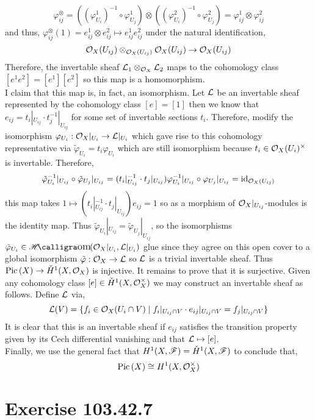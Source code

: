 \documentclass[12pt]{article}
\begin{document}
\[ \varphi_{ij}^\otimes = ((\varphi^1_{U_i})^{-1} \circ \varphi^1_{U_j}) \otimes ((\varphi^2_{U_i})^{-1} \circ \varphi^2_{U_j}) = \varphi_{ij}^1 \otimes \varphi_{ij}^2 \]
and thus, $\varphi_{ij}^\otimes(1) = e_{ij}^1 \otimes e^2_{ij} \mapsto e_{ij}^1 e_{ij}^2$ under the natural identification,
\[ \mathcal{O}_{X}(U_{ij}) \otimes_{\mathcal{O}_{X}(U_{ij})} \mathcal{O}_{X}(U_{ij}) \to \mathcal{O}_{X}(U_{ij}) \]
Therefore, the invertable sheaf $\mathcal{L}_1 \otimes_{\mathcal{O}_{X}} \mathcal{L}_2$ maps to the cohomology class $[e^1 e^2] = [e^1] [e^2]$ so this map is a homomorphism. 
\bigskip\\
I claim that this map is, in fact, an isomorphism. Let $\mathcal{L}$ be an invertable sheaf represented by the cohomology class $[e] = [1]$ then we know that $e_{ij} = t_i |_{U_{ij}} \cdot t_j^{-1} |_{U_{ij}}$ for some set of invertable sections $t_i$. Therefore, modify the isomorphism $\varphi_{U_i} : \mathcal{O}_{X}|_{U_i} \to \mathcal{L} |_{U_i}$ which gave rise to this cohomology representative via $\tilde{\varphi}_{U_i} = t_i \varphi_{U_i}$ which are still isomorphism because $t_i \in \mathcal{O}_{X}(U_i)^\times$ is invertable. Therefore, 
\[ \tilde{\varphi}_{U_i}^{-1}|_{U_{ij}} \circ \tilde{\varphi}_{U_j}|_{U_{ij}} = (t_i |_{U_{ij}}^{-1} \cdot t_j |_{U_{ij}}) \varphi_{U_i}^{-1}|_{U_{ij}} \circ \varphi_{U_j}|_{U_{ij}} = \mathrm{id}_{\mathcal{O}_{X}(U_{ij})} \]
this map takes $1 \mapsto (t_i |_{U_{ij}}^{-1} \cdot t_j |_{U_{ij}}) e_{ij} = 1$ so as a morphism of $\mathcal{O}_{X}|_{U_{ij}}$-modules is the identity map. Thus $\tilde{\varphi}_{U_i} |_{U_{ij}} = \tilde{\varphi}_{U_j} |_{U_{ij}}$, so the isomorphisms $\tilde{\varphi}_{U_i} \in \shHom{}{\struct{X}|_{U_i}}{\L|_{U_i}}$ glue since they agree on this open cover to a global isomorphism $\tilde{\varphi} : \mathcal{O}_{X} \to \mathcal{L}$ so $\mathcal{L}$ is a trivial invertable sheaf. Thus $\mathrm{Pic} \left( X \right) \to \check{H}^1(X, \mathcal{O}_{X})$ is injective. It remains to prove that it is surjective. Given any cohomology class $[e] \in \check{H}^1(X, \mathcal{O}_{X}^\times)$ we may construct an invertable sheaf as follows. Define $\mathcal{L}$ via,
\[ \mathcal{L}(V) = \{ f_i \in \mathcal{O}_{X}(U_i \cap V) \mid f_i |_{U_{ij} \cap V} \cdot e_{ij} |_{U_{ij} \cap V} = f_j |_{U_{ij} \cap V} \} \]
It is clear that this is an invertable sheaf if $e_{ij}$ satisfies the transition property given by its Cech differential vanishing and that $\mathcal{L} \mapsto [e]$. 
\bigskip\\
Finally, we use the general fact that $H^1(X, \mathscr{F}) = \check{H}^1(X, \mathscr{F})$ to conclude that,
\[ \mathrm{Pic} \left( X \right) \cong H^1(X, \mathcal{O}_{X}^\times) \]

\section{Exercise 103.42.7}
\end{document}
